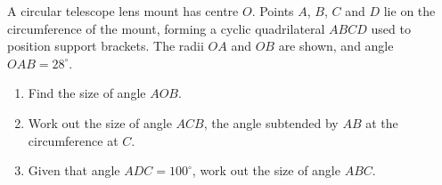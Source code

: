 \begin{question}
\noindent A circular telescope lens mount has centre $O$. Points $A$, $B$, $C$ and $D$ lie on the circumference of the mount, forming a cyclic quadrilateral $ABCD$ used to position support brackets. The radii $OA$ and $OB$ are shown, and angle $OAB = 28^\circ$.

\begin{center}
\end{center}

\begin{enumerate}
    \item[(a)] Find the size of angle $AOB$.

    \vspace{3.5cm}

    \item[(b)] Work out the size of angle $ACB$, the angle subtended by $AB$ at the circumference at $C$.

    \vspace{3cm}

    \item[(c)] Given that angle $ADC = 100^\circ$, work out the size of angle $ABC$.

    \vspace{3cm}
\end{enumerate}
\end{question}

